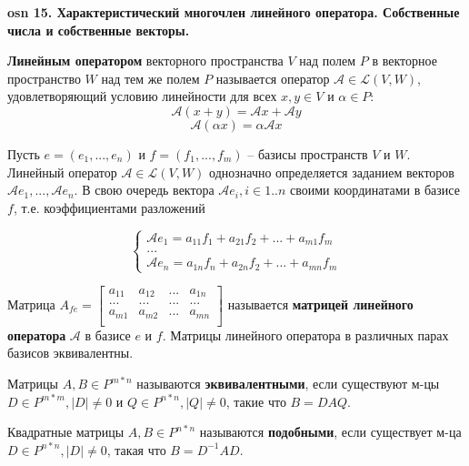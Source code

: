 \setcounter{section}{15}
\setcounter{subsection}{15}
\setcounter{equation}{0}
\textbf{\LARGE osn 15. Характеристический многочлен линейного оператора. Собственные числа и собственные векторы.}

\textbf{Линейным оператором} векторного пространства $V$ над полем $P$ в векторное пространство $W$ над тем же полем $P$ называется оператор $\mathcal{A} \in \mathcal{L}(V, W)$, удовлетворяющий условию линейности для всех $x, y \in V$ и $\alpha \in P$:
$$\mathcal{A} (x+y) = \mathcal{A} x + \mathcal{A} y$$
$$\mathcal{A} (\alpha x) = \alpha \mathcal{A} x$$

Пусть $e = (e_1, ..., e_n)$ и $f = (f_1, ..., f_m)$ -- базисы пространств $V$ и $W$. Линейный оператор $\mathcal{A} \in \mathcal{L}(V, W)$ однозначно определяется заданием векторов $\mathcal{A} e_1, ..., \mathcal{A} e_n$. В свою очередь вектора $\mathcal{A} e_i, i \in 1..n$ своими координатами в базисе $f$, т.е. коэффициентами разложений

$$\begin{cases} 
 \mathcal{A} e_1 = a_{11} f_1 + a_{21} f_2 + ... + a_{m1} f_m \\
 ... \\
 \mathcal{A} e_n = a_{1n} f_n + a_{2n} f_2 + ... + a_{mn} f_m
\end{cases}$$

Матрица $A_{fe} = 
\begin{bmatrix}
a_{11} & a_{12} & ... & a_{1n} \\
... & ... & ... & ... \\
a_{m1} & a_{m2} & ... & a_{mn} \\
\end{bmatrix}$
называется \textbf{матрицей линейного оператора} $\mathcal{A}$ в базисе $e$ и $f$. Матрицы линейного оператора в различных парах базисов эквивалентны.

Матрицы $A, B \in P^{m*n}$ называются \textbf{эквивалентными}, если существуют м-цы $D \in P^{m*m}, |D| \neq 0$ и $Q \in P^{n*n}, |Q| \neq 0$, такие что $B = D A Q$.

Квадратные матрицы $A, B \in P^{n*n}$ называются \textbf{подобными}, если существует м-ца $D \in P^{n*n}, |D| \neq 0$, такая что $B = D^{-1} A D$.


